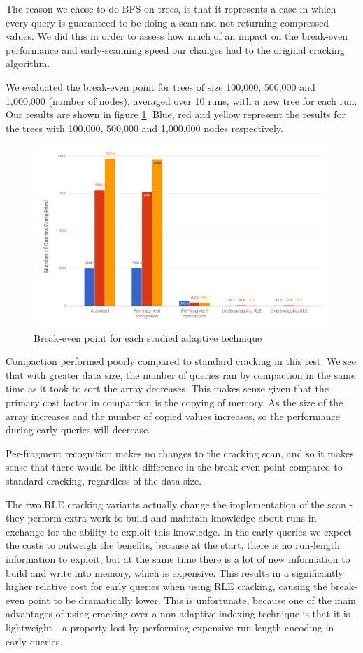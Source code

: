 The reason we chose to do BFS on trees, is that it represents a case in which every query is guaranteed to be doing a scan and not returning compressed values. We did this in order to assess how much of an impact on the break-even performance and early-scanning speed our changes had to the original cracking algorithm.

We evaluated the break-even point for trees of size 100,000, 500,000 and 1,000,000 (number of nodes), averaged over 10 runs, with a new tree for each run. Our results are shown in figure \ref{fig:breakeven}. Blue, red and yellow represent the results for the trees with 100,000, 500,000 and 1,000,000 nodes respectively.

\begin{figure}[h]
  \centering
  \includegraphics[width=\textwidth]{images/breakeven}
  \caption{Break-even point for each studied adaptive technique}
  \label{fig:breakeven}
\end{figure}

Compaction performed poorly compared to standard cracking in this test. We see that with greater data size, the number of queries ran by compaction in the same time as it took to sort the array decreases. This makes sense given that the primary cost factor in compaction is the copying of memory. As the size of the array increases and the number of copied values increases, so the performance during early queries will decrease.

Per-fragment recognition makes no changes to the cracking scan, and so it makes sense that there would be little difference in the break-even point compared to standard cracking, regardless of the data size.

The two RLE cracking variants actually change the implementation of the scan - they perform extra work to build and maintain knowledge about runs in exchange for the ability to exploit this knowledge. In the early queries we expect the costs to outweigh the benefits, because at the start, there is no run-length information to exploit, but at the same time there is a lot of new information to build and write into memory, which is expensive. This results in a significantly higher relative cost for early queries when using RLE cracking, causing the break-even point to be dramatically lower. This is unfortunate, because one of the main advantages of using cracking over a non-adaptive indexing technique is that it is lightweight - a property lost by performing expensive run-length encoding in early queries.

